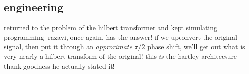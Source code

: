 \subsection*{engineering}
returned to the problem of the hilbert transformer and kept simulating \amp
programming. razavi, once again, has the answer! if we upconvert the original
signal, then put it through an \emph{approximate} \(\pi/2\) phase shift, we'll
get out what is very nearly a hilbert transform of the original! this \emph{is}
the hartley architecture -- thank goodness he actually stated it!
